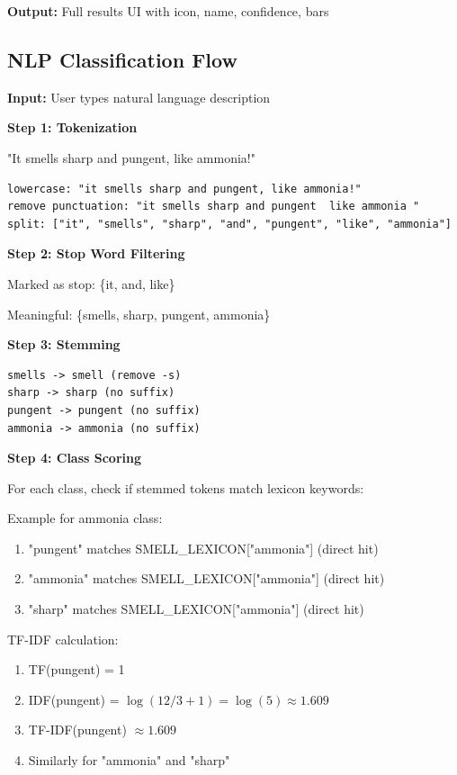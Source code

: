 \documentclass[12pt,a4paper]{article}
\begin{document}
\textbf{Output:} Full results UI with icon, name, confidence, bars

\subsection{NLP Classification Flow}

\textbf{Input:} User types natural language description

\textbf{Step 1: Tokenization}

"It smells sharp and pungent, like ammonia!"

\begin{verbatim}
lowercase: "it smells sharp and pungent, like ammonia!"
remove punctuation: "it smells sharp and pungent  like ammonia "
split: ["it", "smells", "sharp", "and", "pungent", "like", "ammonia"]
\end{verbatim}

\textbf{Step 2: Stop Word Filtering}

Marked as stop: \{it, and, like\}

Meaningful: \{smells, sharp, pungent, ammonia\}

\textbf{Step 3: Stemming}

\begin{verbatim}
smells -> smell (remove -s)
sharp -> sharp (no suffix)
pungent -> pungent (no suffix)
ammonia -> ammonia (no suffix)
\end{verbatim}

\textbf{Step 4: Class Scoring}

For each class, check if stemmed tokens match lexicon keywords:

Example for ammonia class:
\begin{enumerate}
    \item "pungent" matches SMELL\_LEXICON["ammonia"] (direct hit)
    \item "ammonia" matches SMELL\_LEXICON["ammonia"] (direct hit)
    \item "sharp" matches SMELL\_LEXICON["ammonia"] (direct hit)
\end{enumerate}

TF-IDF calculation:
\begin{enumerate}
    \item TF(pungent) = 1
    \item IDF(pungent) = $\log(12/3 + 1) = \log(5) \approx 1.609$
    \item TF-IDF(pungent) $\approx 1.609$
    \item Similarly for "ammonia" and "sharp"
\end{enumerate}
\end{document}
